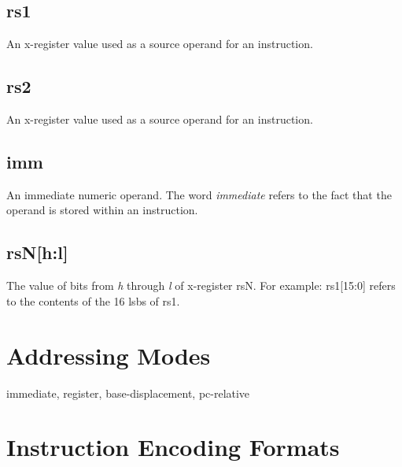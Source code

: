 \subsection{rs1}

An x-register value used as a source operand for an instruction.

\subsection{rs2}

An x-register value used as a source operand for an instruction.

\subsection{imm}

An immediate numeric operand.  The word {\em immediate} refers
to the fact that the operand is stored within an instruction.

\subsection{rsN[h:l]}

The value of bits from {\em h} through {\em l} of x-register rsN.
For example: rs1[15:0] refers to the contents of 
the 16 \acrshort{lsb}s of rs1.


\section{Addressing Modes}

immediate, register, base-displacement, pc-relative


\section{Instruction Encoding Formats}
\label{section:EncodingFormats}



